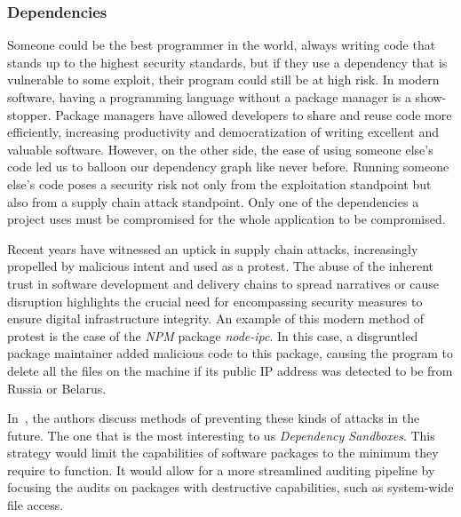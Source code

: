 \documentclass{article}
\begin{document}
\subsubsection{Dependencies}%
Someone could be the best programmer in the world, always writing code that stands up to the highest security standards, but if they use a dependency that is vulnerable to some exploit, their program could still be at high risk. In modern software, having a programming language without a package manager is a show-stopper. Package managers have allowed developers to share and reuse code more efficiently, increasing productivity and democratization of writing excellent and valuable software. However, on the other side, the ease of using someone else's code led us to balloon our dependency graph like never before. Running someone else's code poses a security risk not only from the exploitation standpoint but also from a supply chain attack standpoint. Only one of the dependencies a project uses must be compromised for the whole application to be compromised.

Recent years have witnessed an uptick in supply chain attacks, increasingly propelled by malicious intent and used as a protest. The abuse of the inherent trust in software development and delivery chains to spread narratives or cause disruption highlights the crucial need for encompassing security measures to ensure digital infrastructure integrity. An example of this modern method of protest is the case of the \emph{NPM} package \emph{node-ipc}\cite{LunaSec}. In this case, a disgruntled package maintainer added malicious code to this package, causing the program to delete all the files on the machine if its public IP address was detected to be from Russia or Belarus.

In~\cite{LunaSec}, the authors discuss methods of preventing these kinds of attacks in the future. The one that is the most interesting to us \emph{Dependency Sandboxes}. This strategy would limit the capabilities of software packages to the minimum they require to function. It would allow for a more streamlined auditing pipeline by focusing the audits on packages with destructive capabilities, such as system-wide file access.
\end{document}
